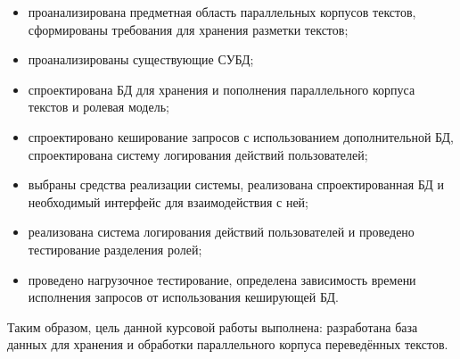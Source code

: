 \begin{itemize}[label=---]
	\item проанализирована предметная область параллельных корпусов текстов, сформированы требования для хранения разметки текстов;
	
	\item проанализированы существующие СУБД;
	
	\item спроектирована БД для хранения и пополнения параллельного корпуса текстов и ролевая модель; 
	
	\item спроектировано кеширование запросов с использованием дополнительной БД, спроектирована систему логирования действий пользователей;
	
	\item выбраны средства реализации системы, реализована спроектированная БД и необходимый интерфейс для взаимодействия с ней;
	
	\item реализована система логирования действий пользователей и проведено тестирование разделения ролей;
	
	\item проведено нагрузочное тестирование, определена зависимость времени исполнения запросов от использования кеширующей БД.
\end{itemize}

Таким образом, цель данной курсовой работы выполнена: разработана база данных для хранения и обработки параллельного корпуса переведённых текстов.

\pagebreak